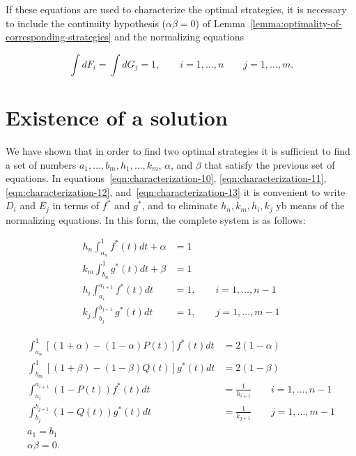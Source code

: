 \documentclass{article}
\begin{document}
If these equations are used to characterize the optimal strategies, it is
necessary to include the continuity hypothesis ($\alpha \beta = 0$) of
Lemma~\ref{lemma:optimality-of-corresponding-strategies} and the normalizing
equations

\[
\int dF_i = \int dG_j = 1, \qquad i = 1, \dots, n \qquad j = 1, \dots, m.
\]

\section{Existence of a solution}

We have shown that in order to find two optimal strategies it is sufficient to
find a set of numbers $a_1, \dots, b_m, h_1, \dots, k_m$, $\alpha$, and
$\beta$ that satisfy the previous set of equations. In
equations~\ref{eqn:characterization-10}, \ref{eqn:characterization-11},
\ref{eqn:characterization-12}, and~\ref{eqn:characterization-13} it is
convenient to write $D_i$ and $E_j$ in terms of $f^*$ and $g^*$, and to
eliminate $h_n, k_m, h_i, k_j$ yb means of the normalizing equations. In this
form, the complete system is as follows:


\begin{align}
h_n \int_{a_n}^1 f^*(t) dt + \alpha &= 1 \label{eqn:existence-14} \\
k_m \int_{b_n}^1 g^*(t) dt + \beta &= 1 \label{eqn:existence-15} \\
h_i \int_{a_i}^{a_{i+1}} f^*(t) dt &= 1, \qquad i=1, \dots, n-1 \label{eqn:existence-16} \\
k_j \int_{b_j}^{b_{j+1}} g^*(t) dt &= 1, \qquad j=1, \dots, m-1 \label{eqn:existence-17}
\end{align}


\begin{align}
\int_{a_n}^1 \left [ (1+\alpha) - (1-\alpha)P(t) \right ] f^*(t) dt &= 2(1-\alpha) \label{eqn:existence-18} \\
\int_{b_m}^1 \left [ (1+\beta) - (1-\beta)Q(t) \right ] g^*(t) dt &= 2(1-\beta) \label{eqn:existence-19} \\
\int_{a_{i}}^{a_{i+1}} (1-P(t))f^*(t) dt &= \frac{1}{h_{i+1}} \qquad i = 1,
\dots, n-1 \label{eqn:existence-20} \\
\int_{b_{j}}^{b_{j+1}} (1-Q(t))g^*(t) dt &= \frac{1}{k_{j+1}} \qquad j=1,
\dots, m-1 \label{eqn:existence-21} \\
a_1 = b_1 \label{eqn:existence-22} \\
\alpha \beta = 0. \label{eqn:existence-23}
\end{align}
\end{document}
